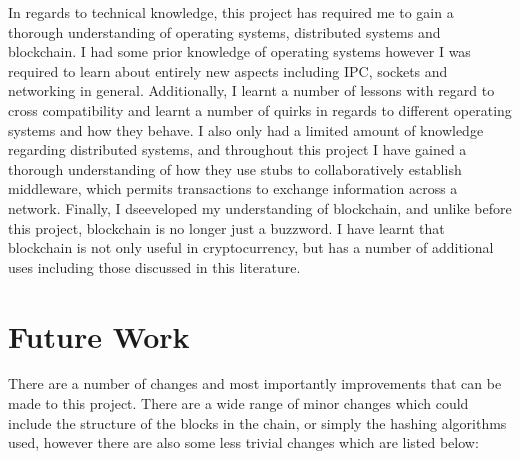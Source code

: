 \documentclass[a4paper, 11pt]{report}
\begin{document}
In regards to technical knowledge, this project has required me to gain a thorough understanding of operating systems, distributed systems and blockchain. I had some prior knowledge of operating systems however I was required to learn about entirely new aspects including \acrshort{IPC}, sockets and networking in general. Additionally, I learnt a number of lessons with regard to cross compatibility and learnt a number of quirks in regards to different operating systems and how they behave. I also only had a limited amount of knowledge regarding distributed systems, and throughout this project I have gained a thorough understanding of how they use \gls{stub}s to collaboratively establish middleware, which permits transactions to exchange information across a network. Finally, I dseeveloped my understanding of blockchain, and unlike before this project, blockchain is no longer just a buzzword. I have learnt that blockchain is not only useful in cryptocurrency, but has a number of additional uses including those discussed in this literature.

\section{Future Work}
There are a number of changes and most importantly improvements that can be made to this project. There are a wide range of minor changes which could include the structure of the blocks in the chain, or simply the hashing algorithms used, however there are also some less trivial changes which are listed below:
\end{document}
